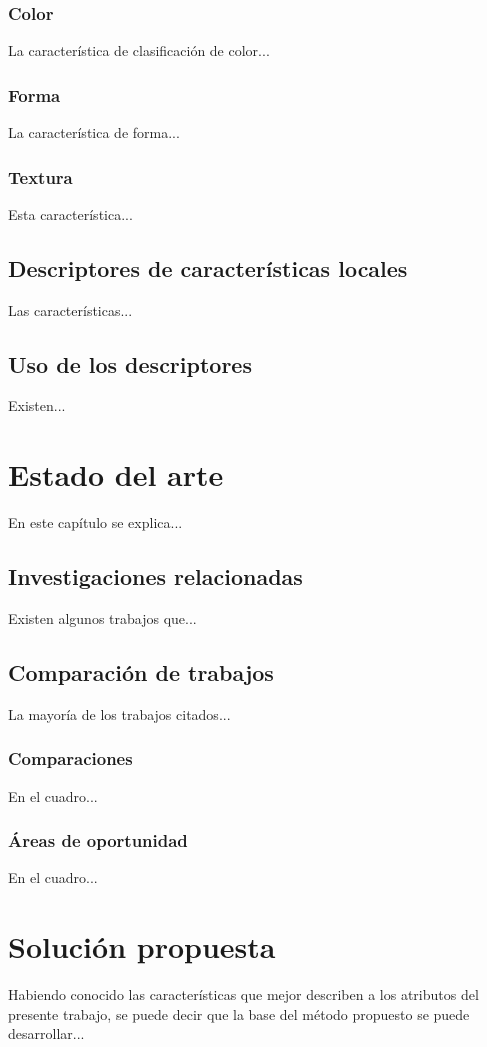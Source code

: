\subsection{Color}
La característica de clasificación de color...

\subsection{Forma}
La característica de forma...

\subsection{Textura} 
Esta característica...

\section{Descriptores de características locales}
Las características...

\section{Uso de los descriptores}
Existen...


\chapter{Estado del arte}
En este capítulo se explica...

\section{Investigaciones relacionadas}
Existen algunos trabajos que...

\section{Comparación de trabajos}
La mayoría de los trabajos citados...

\subsection{Comparaciones}
En el cuadro...

\subsection{Áreas de oportunidad}
En el cuadro...


\chapter{Solución propuesta}
Habiendo conocido las características que mejor describen a los atributos del presente trabajo, se puede decir que la base del método propuesto se puede desarrollar...

